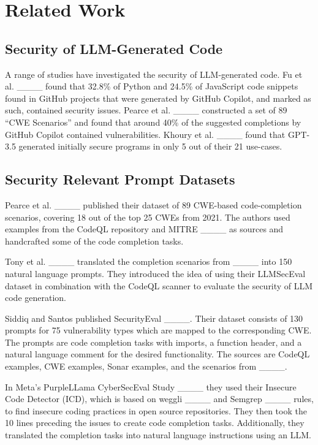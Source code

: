 \section{Related Work}
\label{sec:related_work}


\subsection{Security of LLM-Generated Code}
A range of studies have investigated the security of LLM-generated code. Fu et al. ____ found that 32.8\% of Python and 24.5\% of JavaScript code snippets found in GitHub projects that were generated by GitHub Copilot, and marked as such, contained security issues. Pearce et al. ____ constructed a set of 89 ``CWE Scenarios'' and found that around 40\% of the suggested completions by GitHub Copilot contained vulnerabilities. Khoury et al. ____ found that GPT-3.5 generated initially secure programs in only 5 out of their 21 use-cases. 



\subsection{Security Relevant Prompt Datasets}
Pearce et al. ____ published their dataset of 89 CWE-based code-completion scenarios, covering 18 out of the top 25 CWEs from 2021. The authors used examples from the CodeQL repository and MITRE ____ as sources and handcrafted some of the code completion tasks.

Tony et al. ____ translated the completion scenarios from ____ into 150 natural language prompts. They introduced the idea of using their LLMSecEval dataset in combination with the CodeQL scanner to evaluate the security of LLM code generation.

Siddiq and Santos published SecurityEval ____.
Their dataset consists of 130 prompts for 75 vulnerability types which are mapped to the corresponding CWE.
The prompts are code completion tasks with imports, a function header, and a natural language comment for the desired functionality.
The sources are CodeQL examples, CWE examples, Sonar examples, and the scenarios from ____.

In Meta's PurpleLLama CyberSecEval Study ____ they used their Insecure Code Detector (ICD), which is based on weggli ____ and Semgrep ____ rules, to find insecure coding practices in open source repositories. They then took the 10 lines preceding the issues to create code completion tasks. Additionally, they translated the completion tasks into natural language instructions using an LLM.


